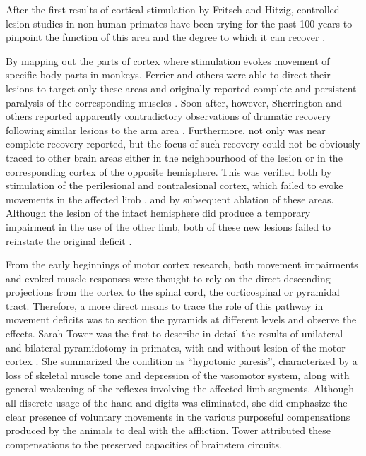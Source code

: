 After the first results of cortical stimulation by Fritsch and Hitzig, controlled lesion studies in non-human primates have been trying for the past 100 years to pinpoint the function of this area and the degree to which it can recover \cite{Darling2011}.

By mapping out the parts of cortex where stimulation evokes movement of specific body parts in monkeys, Ferrier and others were able to direct their lesions to target only these areas and originally reported complete and persistent paralysis of the corresponding muscles \cite{Ferrier1884}. Soon after, however, Sherrington and others reported apparently contradictory observations of dramatic recovery following similar lesions to the arm area \cite{GrahamBrown1913,Leyton1917}. Furthermore, not only was near complete recovery reported, but the focus of such recovery could not be obviously traced to other brain areas either in the neighbourhood of the lesion or in the corresponding cortex of the opposite hemisphere. This was verified both by stimulation of the perilesional and contralesional cortex, which failed to evoke movements in the affected limb \cite{Leyton1917}, and by subsequent ablation of these areas. Although the lesion of the intact hemisphere did produce a temporary impairment in the use of the other limb, both of these new lesions failed to reinstate the original deficit \cite{GrahamBrown1913,Leyton1917}.

From the early beginnings of motor cortex research, both movement impairments and evoked muscle responses were thought to rely on the direct descending projections from the cortex to the spinal cord, the corticospinal or pyramidal tract. Therefore, a more direct means to trace the role of this pathway in movement deficits was to section the pyramids at different levels and observe the effects. Sarah Tower was the first to describe in detail the results of unilateral and bilateral pyramidotomy in primates, with and without lesion of the motor cortex \cite{Tower1940}. She summarized the condition as ``hypotonic paresis'', characterized by a loss of skeletal muscle tone and depression of the vasomotor system, along with general weakening of the reflexes involving the affected limb segments. Although all discrete usage of the hand and digits was eliminated, she did emphasize the clear presence of voluntary movements in the various purposeful compensations produced by the animals to deal with the affliction. Tower attributed these compensations to the preserved capacities of brainstem circuits.

